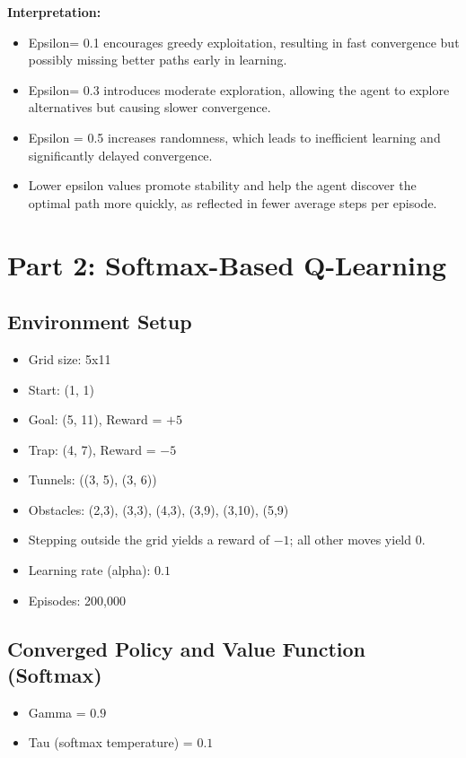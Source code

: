 \documentclass[12pt]{article}
\begin{document}
\textbf{Interpretation:}
\begin{itemize}
  \item Epsilon= 0.1 encourages greedy exploitation, resulting in fast convergence but possibly missing better paths early in learning.
  \item Epsilon= 0.3 introduces moderate exploration, allowing the agent to explore alternatives but causing slower convergence.
  \item Epsilon = 0.5 increases randomness, which leads to inefficient learning and significantly delayed convergence.
  \item Lower epsilon values promote stability and help the agent discover the optimal path more quickly, as reflected in fewer average steps per episode.
\end{itemize}

\section{Part 2: Softmax-Based Q-Learning}

\subsection{Environment Setup}
\begin{itemize}
  \item Grid size: 5x11
  \item Start: (1, 1)
  \item Goal: (5, 11), Reward = \(+5\)
  \item Trap: (4, 7), Reward = \(-5\)
  \item Tunnels: ((3, 5), (3, 6))
  \item Obstacles: (2,3), (3,3), (4,3), (3,9), (3,10), (5,9)
  \item Stepping outside the grid yields a reward of \(-1\); all other moves yield 0.
  \item Learning rate (alpha): \(0.1\)
  \item Episodes: 200,000
\end{itemize}

\subsection{Converged Policy and Value Function (Softmax)}
\begin{itemize}
  \item Gamma = \(0.9\)
  \item Tau (softmax temperature) = \(0.1\)
\end{itemize}
\end{document}
